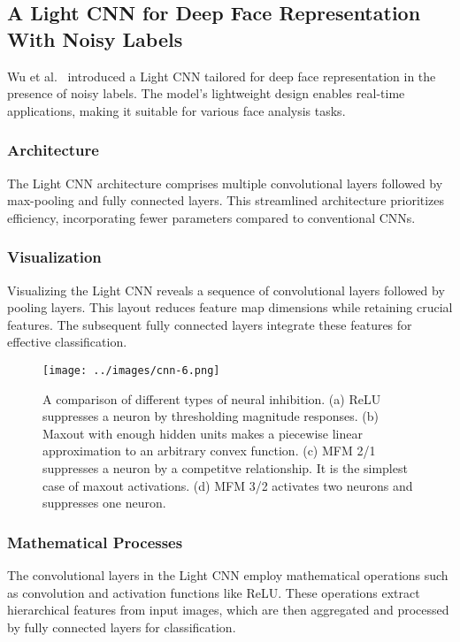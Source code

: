 \documentclass[journal, biblatex]{IEEEtran}
\begin{document}
\subsection{A Light CNN for Deep Face Representation With Noisy Labels}

Wu et al.~\cite{wu2018} introduced a Light CNN tailored for deep face representation in the presence of noisy labels. The model's lightweight design enables real-time applications, making it suitable for various face analysis tasks.

\subsubsection{Architecture}
The Light CNN architecture comprises multiple convolutional layers followed by max-pooling and fully connected layers. This streamlined architecture prioritizes efficiency, incorporating fewer parameters compared to conventional CNNs.

\subsubsection{Visualization}
Visualizing the Light CNN reveals a sequence of convolutional layers followed by pooling layers. This layout reduces feature map dimensions while retaining crucial features. The subsequent fully connected layers integrate these features for effective classification.

\begin{figure}[htbp]
    \centering
    \texttt{[image: ../images/cnn-6.png]}
    \caption{A comparison of different types of neural inhibition. (a) ReLU
    suppresses a neuron by thresholding magnitude responses. (b) Maxout with
    enough hidden units makes a piecewise linear approximation to an arbitrary
    convex function. (c) MFM 2/1 suppresses a neuron by a competitve relationship.
    It is the simplest case of maxout activations. (d) MFM 3/2 activates two
    neurons and suppresses one neuron.}
    \label{fig:neural_inhibition}
\end{figure}

\subsubsection{Mathematical Processes}
The convolutional layers in the Light CNN employ mathematical operations such as convolution and activation functions like ReLU. These operations extract hierarchical features from input images, which are then aggregated and processed by fully connected layers for classification.
\end{document}

